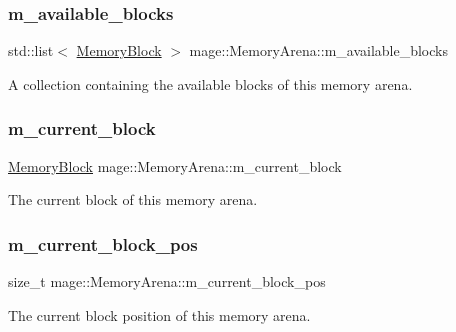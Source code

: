 \subsubsection{\texorpdfstring{m\+\_\+available\+\_\+blocks}{m\_available\_blocks}}
{\footnotesize\ttfamily std\+::list$<$ \hyperlink{classmage_1_1_memory_arena_a133e9d40bd216e3f1d98c6a2b36cf373}{Memory\+Block} $>$ mage\+::\+Memory\+Arena\+::m\+\_\+available\+\_\+blocks\hspace{0.3cm}{\ttfamily [private]}}

A collection containing the available blocks of this memory arena. \hypertarget{classmage_1_1_memory_arena_a2680b25146c174ac7fd639f1bd0acc7c}{}\label{classmage_1_1_memory_arena_a2680b25146c174ac7fd639f1bd0acc7c} 
\subsubsection{\texorpdfstring{m\+\_\+current\+\_\+block}{m\_current\_block}}
{\footnotesize\ttfamily \hyperlink{classmage_1_1_memory_arena_a133e9d40bd216e3f1d98c6a2b36cf373}{Memory\+Block} mage\+::\+Memory\+Arena\+::m\+\_\+current\+\_\+block\hspace{0.3cm}{\ttfamily [private]}}

The current block of this memory arena. \hypertarget{classmage_1_1_memory_arena_a880d07eb372ce1c8b907947fcbdfc59c}{}\label{classmage_1_1_memory_arena_a880d07eb372ce1c8b907947fcbdfc59c} 
\subsubsection{\texorpdfstring{m\+\_\+current\+\_\+block\+\_\+pos}{m\_current\_block\_pos}}
{\footnotesize\ttfamily size\+\_\+t mage\+::\+Memory\+Arena\+::m\+\_\+current\+\_\+block\+\_\+pos\hspace{0.3cm}{\ttfamily [private]}}

The current block position of this memory arena. \hypertarget{classmage_1_1_memory_arena_aeef4c56cf50fd3cbbba2879fcd028b86}{}\label{classmage_1_1_memory_arena_aeef4c56cf50fd3cbbba2879fcd028b86} 
